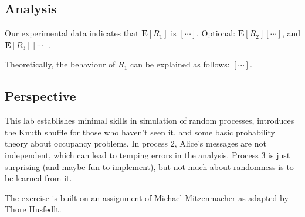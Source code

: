 \documentclass{tufte-handout}
\begin{document}

\subsection{Analysis}

Our experimental data indicates that $\mathbf{E}[R_1]$ is $[\cdots]$. Optional: $\mathbf{E}[R_2] [\cdots]$, and $\mathbf{E}[R_3] [\cdots]$.

Theoretically, the behaviour of $R_1$ can be explained as follows: $[\cdots]$.


\pagebreak

\subsection{Perspective}
This lab establishes minimal skills in simulation of random processes, introduces the Knuth shuffle for those who haven’t seen it, and some basic probability theory about occupancy problems. In process 2, Alice’s messages are not independent, which can lead to temping errors in the analysis. Process 3 is just surprising (and maybe fun to implement), but not much about randomness is to be learned from it.

The exercise is built on an assignment of Michael Mitzenmacher as adapted by Thore Husfedlt.
\end{document}
